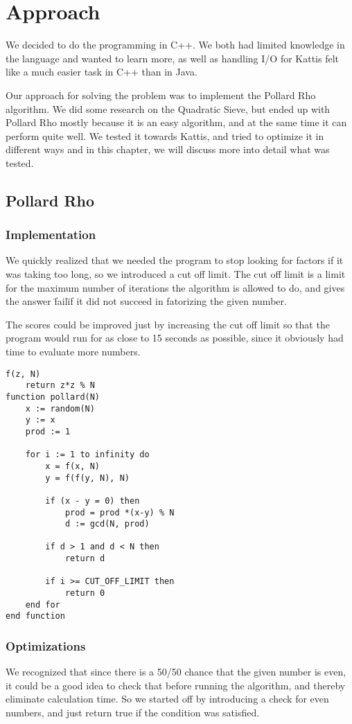 \documentclass[a4paper, 12pt]{report}
\begin{document}
\chapter{Approach}
We decided to do the programming in C++. We both had limited knowledge in the language and wanted to learn more, as well as handling I/O for Kattis felt like a much easier task in C++ than in Java. 

Our approach for solving the problem was to implement the Pollard Rho algorithm. We did some research on the Quadratic Sieve, but ended up with Pollard Rho mostly because it is an easy algorithm, and at the same time it can perform quite well. We tested it towards Kattis, and tried to optimize it in different ways and in this chapter, we will discuss more into detail what was tested.

\section{Pollard Rho}
\subsection{Implementation}

We quickly realized that we needed the program to stop looking for factors if it was taking too long, so we introduced a cut off limit. The cut off limit is a limit for the maximum number of iterations the algorithm is allowed to do, and gives the answer \"fail\" if it did not succeed in fatorizing the given number. 

The scores could be improved just by increasing the cut off limit so that the program would run for as close to 15 seconds as possible, since it obviously had time to evaluate more numbers.

\begin{lstlisting}[frame=single] 
f(z, N)
	return z*z % N
function pollard(N) 
	x := random(N) 
	y := x 	
	prod := 1

	for i := 1 to infinity do
		x = f(x, N)
		y = f(f(y, N), N)

		if (x - y = 0) then
			prod = prod *(x-y) % N
			d := gcd(N, prod)

		if d > 1 and d < N then
			return d

		if i >= CUT_OFF_LIMIT then
			return 0
	end for
end function
\end{lstlisting}

\subsection{Optimizations}
We recognized that since there is a 50/50 chance that the given number is even, it could be a good idea to check that before running the algorithm, and thereby eliminate calculation time. So we started off by introducing a check for even numbers, and just return true if the condition was satisfied.
\end{document}
